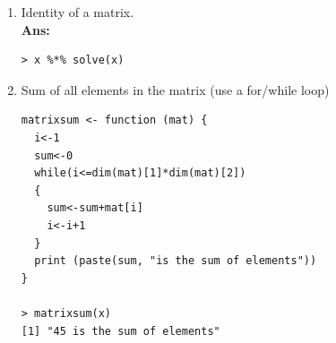 \documentclass[fontsize=10pt]{scrartcl}
\begin{document}
\begin{enumerate}
\begin{enumerate}
  				\item
  				Identity of a matrix. \\
  				\textbf{Ans:} \\
  				\begin{verbatim}
> x %*% solve(x)
  				\end{verbatim}
  				\item
  				Sum of all elements in the matrix (use a for/while loop) \\
\begin{verbatim}
matrixsum <- function (mat) {
  i<-1
  sum<-0
  while(i<=dim(mat)[1]*dim(mat)[2])
  {
    sum<-sum+mat[i]
    i<-i+1
  }
  print (paste(sum, "is the sum of elements"))
}

> matrixsum(x)
[1] "45 is the sum of elements"
\end{verbatim}

			\end{enumerate}
		\end{enumerate}
\end{document}

